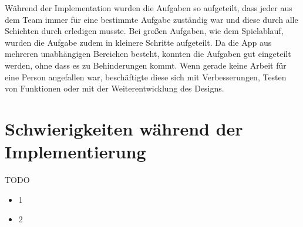 Während der Implementation wurden die Aufgaben so aufgeteilt, dass jeder aus dem Team immer für eine bestimmte Aufgabe zuständig war und diese durch alle Schichten durch erledigen musste. Bei großen Aufgaben, wie dem Spielablauf, wurden die Aufgabe zudem in kleinere Schritte aufgeteilt. Da die App aus mehreren unabhängigen Bereichen besteht, konnten die Aufgaben gut eingeteilt werden, ohne dass es zu Behinderungen kommt. Wenn gerade keine Arbeit für eine Person angefallen war, beschäftigte diese sich mit Verbesserungen, Testen von Funktionen oder mit der Weiterentwicklung des Designs.

\section{Schwierigkeiten während der Implementierung}
\label{sec:implementierung:schwierigkeiten }	

TODO

\begin{itemize} 
\item 1
\item 2
\end{itemize}




